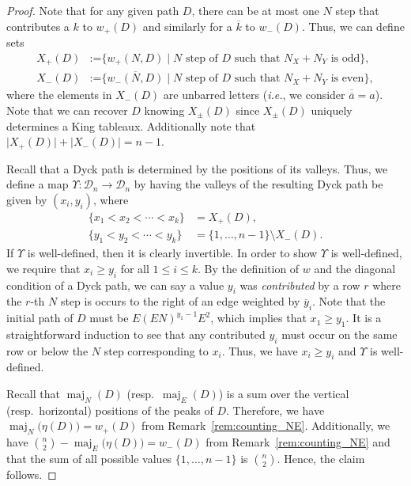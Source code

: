 \documentclass[11pt, leqno]{amsart}
\theoremstyle{plain}
\theoremstyle{definition}
\numberwithin{equation}{section}
\newcommand{\seteq}{\mathbin{:=}}
\newcommand{\Dyck}{\mathcal{D}} %
\newcommand{\maj}{\operatorname{maj}} %
\newcommand{\defn}[1]{{\color{darkred}\emph{#1}}} %
\begin{document}
\begin{proof}
Note that for any given path $D$, there can be at most one $N$ step that contributes a $k$ to $w_+(D)$ and similarly for a $\overline{k}$ to $w_-(D)$.
Thus, we can define sets
\begin{align*}
X_+(D) & \seteq \{ w_+(N, D) \mid \text{$N$ step of $D$ such that $N_X + N_Y$ is odd} \},
\\ X_-(D) & \seteq \{ \overline{w_-(N, D)} \mid \text{$N$ step of $D$ such that $N_X + N_Y$ is even} \},
\end{align*}
where the elements in $X_-(D)$ are unbarred letters (\textit{i.e.}, we consider $\overline{\overline{a}} = a$).
Note that we can recover $D$ knowing $X_{\pm}(D)$ since $X_{\pm}(D)$ uniquely determines a King tableaux.
Additionally note that $\lvert X_+(D) \rvert + \lvert X_-(D) \rvert = n-1$.

Recall that a Dyck path is determined by the positions of its valleys.
Thus, we define a map $\Upsilon \colon \Dyck_n \to \Dyck_n$ by having the valleys of the resulting Dyck path be given by $(x_i, y_i)$, where
\begin{align*}
\{x_1 < x_2 < \cdots < x_k\} & = X_+(D),
\\ \{y_1 < y_2 < \cdots < y_k \} & = \{1, \dotsc, n-1\} \setminus X_-(D).
\end{align*}
If $\Upsilon$ is well-defined, then it is clearly invertible.
In order to show $\Upsilon$ is well-defined, we require that $x_i \geq y_i$ for all $1 \leq i \leq k$.
By the definition of $w$ and the diagonal condition of a Dyck path, we can say a value $y_i$ was \defn{contributed} by a row $r$ where the $r$-th $N$ step is occurs to the right of an edge weighted by $\overline{y}_i$.
Note that the initial path of $D$ must be $E(EN)^{y_1-1}E^2$, which implies that $x_1 \geq y_1$.
It is a straightforward induction to see that any contributed $y_i$ must occur on the same row or below the $N$ step corresponding to $x_i$.
Thus, we have $x_i \geq y_i$ and $\Upsilon$ is well-defined.

Recall that $\maj_N(D)$ (resp.\ $\maj_E(D)$) is a sum over the vertical (resp.\ horizontal) positions of the peaks of $D$.
Therefore, we have $\maj_N\bigl(\eta(D) \bigr) = w_+(D)$ from Remark~\ref{rem:counting_NE}.
Additionally, we have $\binom{n}{2} - \maj_E\bigl(\eta(D) \bigr) = w_-(D)$ from Remark~\ref{rem:counting_NE} and that the sum of all possible values $\{1, \dotsc, n-1\}$ is $\binom{n}{2}$.
Hence, the claim follows.
\end{proof}
\end{document}
